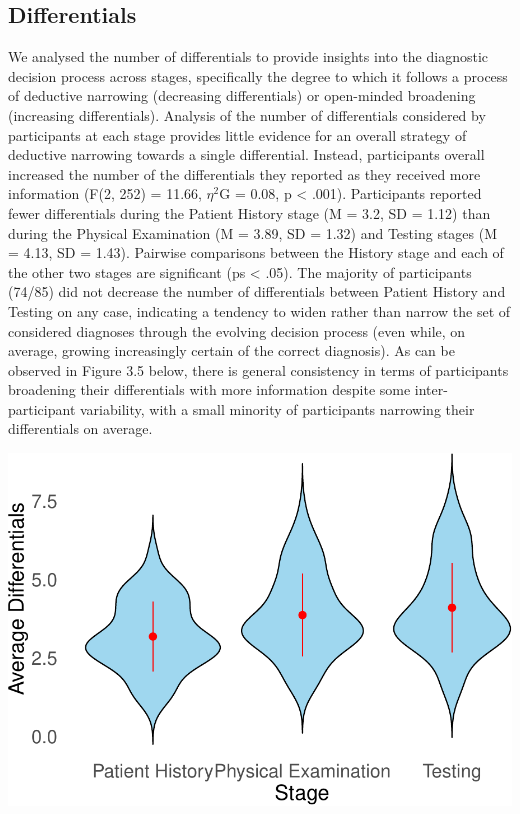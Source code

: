 \documentclass[a4paper, nobind]{templates/ociamthesis}
\begin{document}
\subsection*{Differentials}\label{differentials}

We analysed the number of differentials to provide insights into the diagnostic decision process across stages, specifically the degree to which it follows a process of deductive narrowing (decreasing differentials) or open-minded broadening (increasing differentials). Analysis of the number of differentials considered by participants at each stage provides little evidence for an overall strategy of deductive narrowing towards a single differential. Instead, participants overall increased the number of the differentials they reported as they received more information (F(2, 252) = 11.66, \(\eta^2\)G = 0.08, p \textless{} .001). Participants reported fewer differentials during the Patient History stage (M = 3.2, SD = 1.12) than during the Physical Examination (M = 3.89, SD = 1.32) and Testing stages (M = 4.13, SD = 1.43). Pairwise comparisons between the History stage and each of the other two stages are significant (ps \textless{} .05). The majority of participants (74/85) did not decrease the number of differentials between Patient History and Testing on any case, indicating a tendency to widen rather than narrow the set of considered diagnoses through the evolving decision process (even while, on average, growing increasingly certain of the correct diagnosis). As can be observed in Figure 3.5 below, there is general consistency in terms of participants broadening their differentials with more information despite some inter-participant variability, with a small minority of participants narrowing their differentials on average.

\newpage

\begin{center}\includegraphics[width=1\linewidth]{_main_files/figure-latex/diffsOverStages-1} \end{center}
\end{document}

